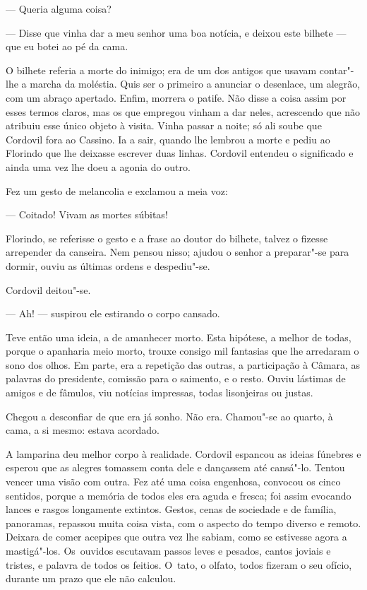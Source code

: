 \begin{linenumbers}
--- Queria alguma coisa?

--- Disse que vinha dar a meu senhor uma boa notícia, e deixou este
bilhete --- que eu botei ao pé da cama.

O bilhete referia a morte do inimigo; era de um dos antigos que usavam
contar"-lhe a marcha da moléstia. Quis ser o primeiro a anunciar o
desenlace, um alegrão, com um abraço apertado. Enfim, morrera o patife.
Não disse a coisa assim por esses termos claros, mas os que empregou
vinham a dar neles, acrescendo que não atribuiu esse único objeto à
visita. Vinha passar a noite; só ali soube que Cordovil fora ao Cassino.
Ia a sair, quando lhe lembrou a morte e pediu ao Florindo que lhe
deixasse escrever duas linhas. Cordovil entendeu o significado e ainda
uma vez lhe doeu a agonia do outro.

Fez um gesto de melancolia e exclamou a meia voz:

--- Coitado! Vivam as mortes súbitas!

Florindo, se referisse o gesto e a frase ao doutor do bilhete, talvez o
fizesse arrepender da canseira. Nem pensou nisso; ajudou o senhor a
preparar"-se para dormir, ouviu as últimas ordens e despediu"-se.

Cordovil deitou"-se.

--- Ah! --- suspirou ele estirando o corpo cansado.

Teve então uma ideia, a de amanhecer morto. Esta hipótese, a melhor de
todas, porque o apanharia meio morto, trouxe consigo mil fantasias que
lhe arredaram o sono dos olhos. Em parte, era a repetição das outras, a
participação à Câmara, as palavras do presidente, comissão para o
saimento, e o resto. Ouviu lástimas de amigos e de fâmulos, viu notícias
impressas, todas lisonjeiras ou justas.

Chegou a desconfiar de que era já sonho. Não era. Chamou"-se ao quarto, à
cama, a si mesmo: estava acordado.

A lamparina deu melhor corpo à realidade. Cordovil espancou as ideias
fúnebres e esperou que as alegres tomassem conta dele e dançassem até
cansá"-lo. Tentou vencer uma visão com outra. Fez até uma coisa
engenhosa, convocou os cinco sentidos, porque a memória de todos eles
era aguda e fresca; foi assim evocando lances e rasgos longamente
extintos. Gestos, cenas de sociedade e de família, panoramas, repassou
muita coisa vista, com o aspecto do tempo diverso e remoto. Deixara de
comer acepipes que outra vez lhe sabiam, como se estivesse agora a
mastigá"-los. Os~ouvidos escutavam passos leves e pesados, cantos joviais
e tristes, e palavra de todos os feitios. O~tato, o olfato, todos
fizeram o seu ofício, durante um prazo que ele não calculou.


\end{linenumbers}
